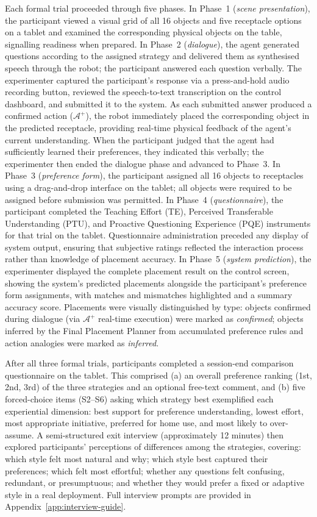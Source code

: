 \documentclass[manuscript,review,anonymous]{acmart}
\begin{document}
Each formal trial proceeded through five phases. In Phase~1 (\textit{scene presentation}), the participant viewed a visual grid of all 16 objects and five receptacle options on a tablet and examined the corresponding physical objects on the table, signalling readiness when prepared. In Phase~2 (\textit{dialogue}), the agent generated questions according to the assigned strategy and delivered them as synthesised speech through the robot; the participant answered each question verbally. The experimenter captured the participant's response via a press-and-hold audio recording button, reviewed the speech-to-text transcription on the control dashboard, and submitted it to the system. As each submitted answer produced a confirmed action ($\mathcal{A}^+$), the robot immediately placed the corresponding object in the predicted receptacle, providing real-time physical feedback of the agent's current understanding. When the participant judged that the agent had sufficiently learned their preferences, they indicated this verbally; the experimenter then ended the dialogue phase and advanced to Phase~3. In Phase~3 (\textit{preference form}), the participant assigned all 16 objects to receptacles using a drag-and-drop interface on the tablet; all objects were required to be assigned before submission was permitted. In Phase~4 (\textit{questionnaire}), the participant completed the Teaching Effort (TE), Perceived Transferable Understanding (PTU), and Proactive Questioning Experience (PQE) instruments for that trial on the tablet. Questionnaire administration preceded any display of system output, ensuring that subjective ratings reflected the interaction process rather than knowledge of placement accuracy. In Phase~5 (\textit{system prediction}), the experimenter displayed the complete placement result on the control screen, showing the system's predicted placements alongside the participant's preference form assignments, with matches and mismatches highlighted and a summary accuracy score. Placements were visually distinguished by type: objects confirmed during dialogue (via $\mathcal{A}^+$ real-time execution) were marked as \textit{confirmed}; objects inferred by the Final Placement Planner from accumulated preference rules and action analogies were marked as \textit{inferred}.

After all three formal trials, participants completed a session-end comparison questionnaire on the tablet. This comprised (a) an overall preference ranking (1st, 2nd, 3rd) of the three strategies and an optional free-text comment, and (b) five forced-choice items (S2--S6) asking which strategy best exemplified each experiential dimension: best support for preference understanding, lowest effort, most appropriate initiative, preferred for home use, and most likely to over-assume. A semi-structured exit interview (approximately 12 minutes) then explored participants' perceptions of differences among the strategies, covering: which style felt most natural and why; which style best captured their preferences; which felt most effortful; whether any questions felt confusing, redundant, or presumptuous; and whether they would prefer a fixed or adaptive style in a real deployment. Full interview prompts are provided in Appendix~\ref{app:interview-guide}.
\end{document}
